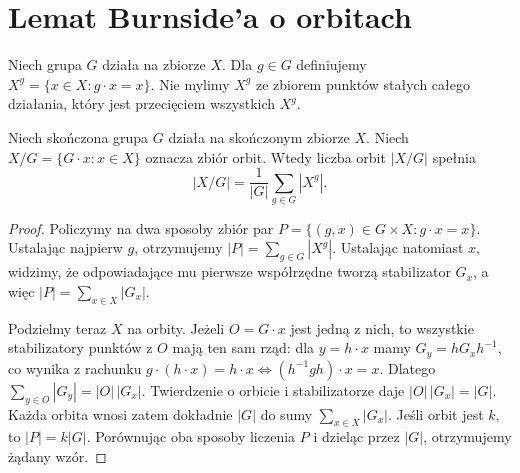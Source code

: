 \section{Lemat Burnside'a o orbitach}
\begin{definicja}
Niech grupa $G$ działa na zbiorze $X$.
Dla $g\in G$ definiujemy
$X^g=\{x\in X:g\cdot x=x\}$.
Nie mylimy $X^g$ ze zbiorem punktów stałych całego działania,
który jest przecięciem wszystkich $X^g$.
\end{definicja}

\begin{twierdzenie}
\label{aa:tw:burnside}
Niech skończona grupa $G$ działa na skończonym zbiorze $X$.
Niech $X/G=\{G\cdot x:x\in X\}$ oznacza zbiór orbit.
Wtedy liczba orbit $|X/G|$ spełnia
\[
 |X/G|=\frac{1}{|G|}\sum_{g\in G}|X^g|.
\]
\end{twierdzenie}
\begin{proof}
Policzymy na dwa sposoby zbiór par
$P=\{(g,x)\in G\times X:g\cdot x=x\}$.
Ustalając najpierw $g$, otrzymujemy
$|P|=\sum_{g\in G}|X^g|$.
Ustalając natomiast $x$, widzimy, że odpowiadające mu
pierwsze współrzędne tworzą stabilizator $G_x$,
a więc $|P|=\sum_{x\in X}|G_x|$.

Podzielmy teraz $X$ na orbity. Jeżeli $O=G\cdot x$
jest jedną z nich, to wszystkie stabilizatory punktów z $O$
mają ten sam rząd: dla $y=h\cdot x$ mamy
$G_y=hG_xh^{-1}$, co wynika z rachunku
$g\cdot(h\cdot x)=h\cdot x\iff
(h^{-1}gh)\cdot x=x$.
Dlatego
$\sum_{y\in O}|G_y|=|O|\,|G_x|$.
Twierdzenie o orbicie i stabilizatorze daje
$|O|\,|G_x|=|G|$.
Każda orbita wnosi zatem dokładnie $|G|$ do sumy
$\sum_{x\in X}|G_x|$.
Jeśli orbit jest $k$, to $|P|=k|G|$.
Porównując oba sposoby liczenia $P$ i dzieląc przez $|G|$,
otrzymujemy żądany wzór.
\end{proof}

